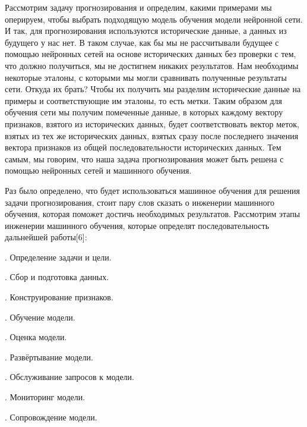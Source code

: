 {  \par \redline	Рассмотрим задачу прогнозирования и определим, какими примерами мы оперируем, чтобы выбрать подходящую модель обучения модели нейронной сети. И так, для прогнозирования используются исторические данные, а данных из будущего у нас нет. В таком случае, как бы мы не рассчитывали будущее с помощью нейронных сетей на основе исторических данных без проверки с тем, что должно получиться, мы не достигнем никаких результатов. Нам необходимы некоторые эталоны, с которыми мы могли сравнивать полученные результаты сети. Откуда их брать? Чтобы их получить мы разделим исторические данные на примеры и соответствующие им эталоны, то есть метки. Таким образом для обучения сети мы получим помеченные данные, в которых каждому вектору признаков, взятого из исторических данных, будет соответствовать вектор меток, взятых из тех же исторических данных, взятых сразу после последнего значения вектора признаков из общей последовательности исторических данных. Тем самым, мы говорим, что наша задача прогнозирования может быть решена с помощью нейронных сетей и машинного обучения.

  \par \redline Раз было определено, что будет использоваться машинное обучения для решения задачи прогнозирования, стоит пару слов сказать о инженерии машинного обучения, которая поможет достичь необходимых результатов. Рассмотрим этапы инженерии машинного обучения, которые определят последовательность дальнейшей работы[6]:

  \par {}. Определение задачи и цели.
  \par {}. Сбор и подготовка данных.
  \par {}. Конструирование признаков.
  \par {}. Обучение модели.
  \par {}. Оценка модели.
  \par {}. Развёртывание модели.
  \par {}. Обслуживание запросов к модели.
  \par {}. Мониторинг модели.
  \par {}. Сопровождение модели.

}
